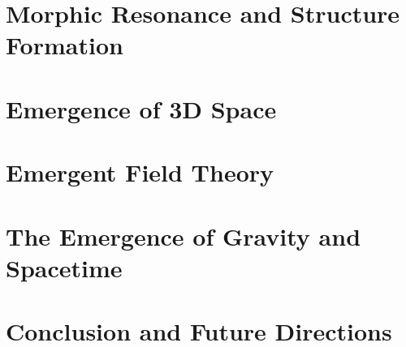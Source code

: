 \chapter{Morphic Resonance and Structure Formation}\label{ch:MorphicResonanceandStructureFormation}

\newpage
\chapter{Emergence of 3D Space}\label{ch:Emergenceof3DSpace}

\newpage
\chapter{Emergent Field Theory}\label{ch:EmergentFieldTheory}

\newpage
\chapter{The Emergence of Gravity and Spacetime}\label{ch:TheEmergenceofGravityandSpacetime}

\newpage
\chapter{Conclusion and Future Directions}\label{ch:ConclusionandFutureDirections}


%
%


